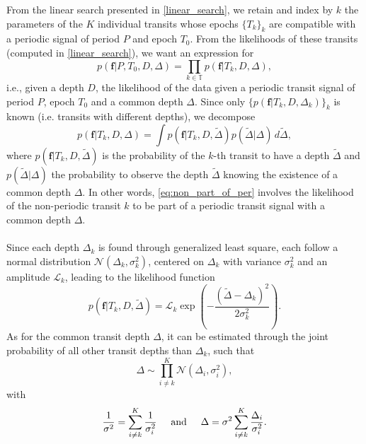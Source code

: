 \documentclass{aastex631}
\begin{document}
\newcommand{\sumTk}{i\neq k}
From the linear search presented in \autoref{linear_search}, we retain and index by $k$ the parameters of the $K$ individual transits whose epochs $\{T_k\}_k$ are compatible with a periodic signal of period $P$ and epoch $T_0$. From the likelihoods of these transits (computed in \autoref{linear_search}), we want an expression for
\begin{equation*}
    p(\bm{f} \vert P, T_0 ,D, \Delta) = \prod_{k\in\mathbb{T}} p(\bm{f} \vert T_k, D, \Delta),
\end{equation*}
i.e., given a depth $D$, the likelihood of the data given a periodic transit signal of period $P$, epoch $T_0$ and a common depth $\Delta$. Since only $\{p(\bm{f} \vert T_k, D, \Delta_k)\}_{k}$ is known (i.e. transits with different depths), we decompose
\begin{equation}\label{eq:non_part_of_per}
    p(\bm{f} \vert T_k, D, \Delta) = \int p(\bm{f} \vert T_k, D, \tilde\Delta)p(\tilde\Delta | \Delta)\, d\tilde\Delta,
\end{equation}
where $p(\bm{f} \vert T_k, D, \tilde\Delta)$ is the probability of the $k$-th transit to have a depth $\tilde\Delta$ and $p(\tilde\Delta | \Delta)$ the probability to observe the depth $\tilde\Delta$ knowing the existence of a common depth $\Delta$. In other words, \autoref{eq:non_part_of_per} involves the likelihood of the non-periodic transit $k$ to be part of a periodic transit signal with a common depth $\Delta$.
\\\\
Since each depth $\Delta_k$ is found through generalized least square, each follow a normal distribution $\mathcal{N}(\Delta_k, \sigma_k^2)$, centered on $\Delta_k$ with variance $\sigma_k^2$ and an amplitude $\mathcal{L}_k$, leading to the likelihood function
\begin{equation*}
    p(\bm{f} \vert T_k, D, \tilde\Delta) = \mathcal{L}_k\exp \left(-\frac{(\tilde\Delta-\Delta_k)^2}{2\sigma_k^2}\right).
\end{equation*}
As for the common transit depth $\Delta$, it can be estimated through the joint probability of all other transit depths than $\Delta_k$, such that
\begin{equation*}
    \Delta \sim \prod_{\sumTk}^K \mathcal{N}(\Delta_i, \sigma_i^2),
\end{equation*}
with 
\begin{equation}\label{eq:params}
\frac{1}{\sigma^2} = \sum_{\sumTk}^K \frac{1}{\sigma_i^2} \hspace{0.5cm} \text{and} \hspace{0.5cm}
\Delta =\sigma^2 \sum_{\sumTk}^K {\frac{\Delta_i}{\sigma_i^2}}.
\end{equation}
\end{document}
